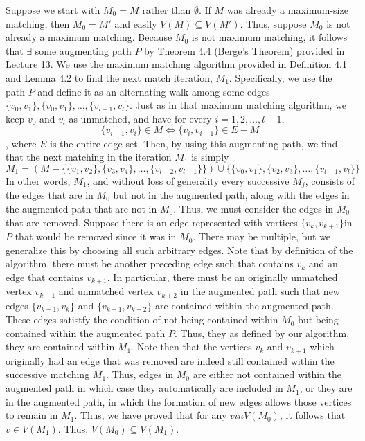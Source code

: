 \documentclass[11pt]{article}
\begin{document}
\begin{enumerate}
\begin{enumerate}
        Suppose we start with $M_0 = M$ rather than $\emptyset$. If $M$ was already a maximum-size matching, then $M_0 = M'$ and easily $V(M) \subseteq V(M')$. Thus, suppose $M_0$ is not already a maximum matching. Because $M_0$ is not maximum matching, it follows that $\exists$ some augmenting path $P$ by Theorem 4.4 (Berge's Theorem) provided in Lecture 13. We use the maximum matching algorithm provided in Definition 4.1 and Lemma 4.2 to find the next match iteration, $M_1$. Specifically, we use the path $P$ and define it as an alternating walk among some edges ${\{v_0, v_1\},  \{v_0, v_1\}, \dots, \{v_{l-1}, v_{l}\}}$. Just as in that maximum matching algorithm, we keep $v_0$ and $v_{l}$ as unmatched, and have for every $i=1, 2, \dots, l-1$, 
        $$\{v_{i-1}, v_i\} \in M \iff \{v_{i}, v_{i+1}\} \in E - M$$, where $E$ is the entire edge set. Then, by using this augmenting path, we find that the next matching in the iteration $M_1$ is simply 
        $$
        M_{1} = (M - \{\{v_1, v_2\}, \{v_3, v_4\}, \dots , \{v_{l−2}, v_{l-1}\}\}) \cup \{\{v_0, v_1\}, \{v_2, v_3\}, \dots , \{v_{l-1}, v_l\}\}
        $$
        In other words, $M_1$, and without loss of generality every successive $M_j$, consists of the edges that are in $M_0$ but not in the augmented path, along with the edges in the augmented path that are not in $M_0$. Thus, we must consider the edges in $M_0$ that are removed. Suppose there is an edge represented with vertices $\{v_{k}, v_{k+1}\}$in $P$ that would be removed since it was in $M_0$. There may be multiple, but we generalize this by choosing all such arbitrary edges. Note that by definition of the algorithm, there must be another preceding edge such that contains $v_k$ and an edge that contains $v_{k+1}$. In particular, there must be an originally unmatched vertex $v_{k-1}$ and unmatched vertex $v_{k+2}$ in the augmented path such that new edges $\{v_{k-1}, v_k\}$ and $\{v_{k+1}, v_{k+2}\}$ are contained within the augmented path. These edges satistfy the condition of not being contained within $M_0$ but being contained within the augmented path $P$. Thus, they as defined by our algorithm, they are contained within $M_1$. Note then that the vertices $v_k$ and $v_{k+1}$ which originally had an edge that was removed are indeed still contained within the successive matching $M_1$. Thus, edges in $M_0$ are either not contained within the augmented path in which case they automatically are included in $M_1$, or they are in the augmented path, in which the formation of new edges allows those vertices to remain in $M_1$. Thus, we have proved that for any $v in V(M_0)$, it follows that $v \in V(M_1)$. Thus, $V(M_0) \subseteq V(M_1)$. \\
        

\end{enumerate}
\end{enumerate}
\end{document}
